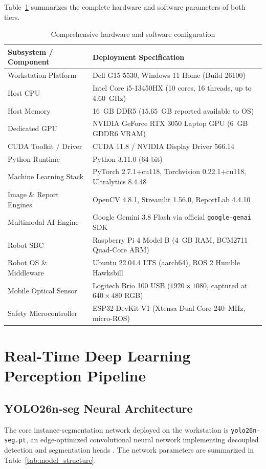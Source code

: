 \documentclass[12pt,a4paper,oneside]{report}
\begin{document}
Table~\ref{tab:environment_full} summarizes the complete hardware and software parameters of both tiers.

\begin{table}[htbp]
\caption{Comprehensive hardware and software configuration}
\label{tab:environment_full}
\centering
\begin{tabularx}{0.96\textwidth}{>{\raggedright\arraybackslash}p{}X}
\toprule
\textbf{Subsystem / Component} & \textbf{Deployment Specification}\\
\midrule
Workstation Platform & Dell G15 5530, Windows 11 Home (Build 26100)\\
Host CPU & Intel Core i5-13450HX (10 cores, 16 threads, up to 4.60~GHz)\\
Host Memory & 16~GB DDR5 ($15.65$~GB reported available to OS)\\
Dedicated GPU & NVIDIA GeForce RTX 3050 Laptop GPU (6~GB GDDR6 VRAM)\\
CUDA Toolkit / Driver & CUDA 11.8 / NVIDIA Display Driver 566.14\\
Python Runtime & Python 3.11.0 (64-bit)\\
Machine Learning Stack & PyTorch 2.7.1+cu118, Torchvision 0.22.1+cu118, Ultralytics 8.4.48\\
Image \& Report Engines & OpenCV 4.8.1, Streamlit 1.56.0, ReportLab 4.4.10\\
Multimodal AI Engine & Google Gemini 3.8 Flash via official \texttt{google-genai} SDK\\
Robot SBC & Raspberry Pi 4 Model B (4~GB RAM, BCM2711 Quad-Core ARM)\\
Robot OS \& Middleware & Ubuntu 22.04.4 LTS (aarch64), ROS 2 Humble Hawksbill\\
Mobile Optical Sensor & Logitech Brio 100 USB ($1920\times1080$, captured at $640\times480$ RGB)\\
Safety Microcontroller & ESP32 DevKit V1 (Xtensa Dual-Core 240~MHz, micro-ROS)\\
\bottomrule
\end{tabularx}
\end{table}


\chapter{Real-Time Deep Learning Perception Pipeline}
\label{ch:perception}

\section{YOLO26n-seg Neural Architecture}
The core instance-segmentation network deployed on the workstation is \texttt{yolo26n-seg.pt}, an edge-optimized convolutional neural network implementing decoupled detection and segmentation heads \cite{redmon2016, ultralytics}. The network parameters are summarized in Table~\ref{tab:model_structure}.
\end{document}
